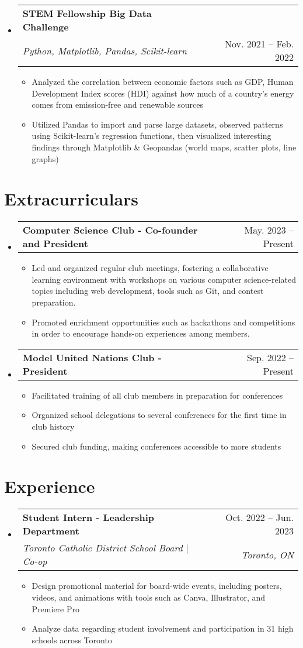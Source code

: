 \documentclass[letterpaper,11pt]{article}
\makeatletter
\newcommand{\resumeItem}[1]{
  \item\small{
    {#1 \vspace{-2pt}}
  }
}
\newcommand{\resumeSubheading}[4]{
  \vspace{-2pt}\item
    \begin{tabular*}{0.97\textwidth}[t]{l@{\extracolsep{\fill}}r}
      \textbf{#1} & #2 \\
      \textit{\small#3} & \textit{\small #4} \\
    \end{tabular*}\vspace{-7pt}
}
\newcommand{\resumeProjectHeading}[2]{
    \item
    \begin{tabular*}{0.97\textwidth}{l@{\extracolsep{\fill}}r}
      \small#1 & #2 \\
    \end{tabular*}\vspace{-4pt}
}
\newcommand{\resumeSubHeadingListStart}{\begin{itemize}[leftmargin=0.15in, label={}]}
\newcommand{\resumeSubHeadingListEnd}{\end{itemize}}
\newcommand{\resumeItemListStart}{\begin{itemize}}
\newcommand{\resumeItemListEnd}{\end{itemize}\vspace{-5pt}}
\makeatother
\begin{document}
     \resumeSubHeadingListStart
      \resumeProjectHeading
          {\textbf{STEM Fellowship Big Data Challenge} \\ \emph{Python, Matplotlib, Pandas, Scikit-learn}}{Nov. 2021 -- Feb. 2022}
          \resumeItemListStart
            \resumeItem{Analyzed the correlation between economic factors such as GDP, Human Development Index scores (HDI) against how much of a country's energy comes from emission-free and renewable sources}
            \resumeItem{Utilized Pandas to import and parse large datasets, observed patterns using Scikit-learn's regression functions, then visualized interesting findings through Matplotlib \& Geopandas (world maps, scatter plots, line graphs)}
          \resumeItemListEnd
    \resumeSubHeadingListEnd

\section{Extracurriculars}
    \resumeSubHeadingListStart
    \resumeProjectHeading
          {\textbf{Computer Science Club - Co-founder and President}}{May. 2023 -- Present}
          \resumeItemListStart
            \resumeItem{Led and organized regular club meetings, fostering a collaborative learning environment with workshops on various computer science-related topics including web development, tools such as Git, and contest preparation.}
            \resumeItem{Promoted enrichment opportunities such as hackathons and competitions in order to encourage hands-on experiences among members.}
          \resumeItemListEnd
      \resumeProjectHeading
          {\textbf{Model United Nations Club - President}}{Sep. 2022 -- Present}
          \resumeItemListStart
            \resumeItem{Facilitated training of all club members in preparation for conferences}
            \resumeItem{Organized school delegations to several conferences for the first time in club history}
            \resumeItem{Secured club funding, making conferences accessible to more students}
          \resumeItemListEnd
    \resumeSubHeadingListEnd
    
\section{Experience}
  \resumeSubHeadingListStart
    \resumeSubheading
      {Student Intern - Leadership Department}{Oct. 2022 -- Jun. 2023}
      {Toronto Catholic District School Board $|$ \emph{Co-op}}{Toronto, ON}
      \resumeItemListStart
        \resumeItem{Design promotional material for board-wide events, including posters, videos, and animations with tools such as Canva, Illustrator, and Premiere Pro}
        \resumeItem{Analyze data regarding student involvement and participation in 31 high schools across Toronto}
      \resumeItemListEnd
    \resumeSubHeadingListEnd
\end{document}
